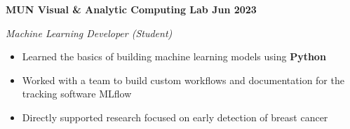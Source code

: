 \textbf{MUN Visual \& Analytic Computing Lab \hfill Jun 2023}\par

\textit{Machine Learning Developer (Student)}
\begin{itemize}
    \item Learned the basics of building machine learning models using \textbf{Python}
    \item Worked with a team to build custom workflows and documentation for the tracking software MLflow
    \item Directly supported research focused on early detection of breast cancer
\end{itemize}\par

